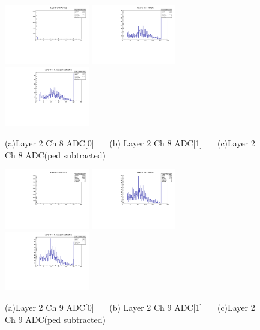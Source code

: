 \documentclass[a4paper,11pt]{article}
\theoremstyle{mytheor}
\begin{document}
\begin{figure}[H] 
\vspace*{-0.3cm} 
\includegraphics[width=0.33\textwidth,scale=0.5,trim=0 0 0 0,clip]{plotsdir/file0_muons-Layer2_Ch8_adc0-1.pdf} 
\includegraphics[width=0.33\textwidth,scale=0.5,trim=0 0 0 0,clip]{plotsdir/file0_muons-Layer2_Ch8_adc1-1.pdf} 
\includegraphics[width=0.33\textwidth,scale=0.5,trim=0 0 0 0,clip]{plotsdir/file0_muons-Layer2_Ch8_adcPedsub-1.pdf} 
\caption{(a)Layer 2 Ch 8 ADC[0] ~~~(b) Layer 2 Ch 8 ADC[1] ~~~(c)Layer 2 Ch 8 ADC(ped subtracted) } 
\end{figure} 
\begin{figure}[H] 
\vspace*{-0.3cm} 
\includegraphics[width=0.33\textwidth,scale=0.5,trim=0 0 0 0,clip]{plotsdir/file0_muons-Layer2_Ch9_adc0-1.pdf} 
\includegraphics[width=0.33\textwidth,scale=0.5,trim=0 0 0 0,clip]{plotsdir/file0_muons-Layer2_Ch9_adc1-1.pdf} 
\includegraphics[width=0.33\textwidth,scale=0.5,trim=0 0 0 0,clip]{plotsdir/file0_muons-Layer2_Ch9_adcPedsub-1.pdf} 
\caption{(a)Layer 2 Ch 9 ADC[0] ~~~(b) Layer 2 Ch 9 ADC[1] ~~~(c)Layer 2 Ch 9 ADC(ped subtracted) } 
\end{figure} 
\end{document}
